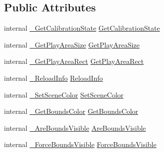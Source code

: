 \subsection*{Public Attributes}
\begin{DoxyCompactItemize}
\item 
internal \mbox{\hyperlink{struct_valve_1_1_v_r_1_1_i_v_r_chaperone_ae940ed5f0954e57503fd3c59e6a52bbd}{\+\_\+\+Get\+Calibration\+State}} \mbox{\hyperlink{struct_valve_1_1_v_r_1_1_i_v_r_chaperone_a0c4eddaed9adf7789b4722c2b66e75d9}{Get\+Calibration\+State}}
\item 
internal \mbox{\hyperlink{struct_valve_1_1_v_r_1_1_i_v_r_chaperone_a2eada0fcf01f701837846219447de33d}{\+\_\+\+Get\+Play\+Area\+Size}} \mbox{\hyperlink{struct_valve_1_1_v_r_1_1_i_v_r_chaperone_a4293e2f9b2d3ce4109520e2255d651e5}{Get\+Play\+Area\+Size}}
\item 
internal \mbox{\hyperlink{struct_valve_1_1_v_r_1_1_i_v_r_chaperone_a489fd7799318412b5ecf95dba2dadc6a}{\+\_\+\+Get\+Play\+Area\+Rect}} \mbox{\hyperlink{struct_valve_1_1_v_r_1_1_i_v_r_chaperone_a4586ae0d839568f24485414975d0f51d}{Get\+Play\+Area\+Rect}}
\item 
internal \mbox{\hyperlink{struct_valve_1_1_v_r_1_1_i_v_r_chaperone_a8de5e80b3169e3fa61c6bed940006796}{\+\_\+\+Reload\+Info}} \mbox{\hyperlink{struct_valve_1_1_v_r_1_1_i_v_r_chaperone_a783f0aaa0cdb9747595300a48ebf49a0}{Reload\+Info}}
\item 
internal \mbox{\hyperlink{struct_valve_1_1_v_r_1_1_i_v_r_chaperone_ac52b4f817e60c163ab42c6fbe71cd116}{\+\_\+\+Set\+Scene\+Color}} \mbox{\hyperlink{struct_valve_1_1_v_r_1_1_i_v_r_chaperone_a4c43b34facc6450ec73f70dae7349fae}{Set\+Scene\+Color}}
\item 
internal \mbox{\hyperlink{struct_valve_1_1_v_r_1_1_i_v_r_chaperone_a57187a62a05e7c3b6e31254db3608027}{\+\_\+\+Get\+Bounds\+Color}} \mbox{\hyperlink{struct_valve_1_1_v_r_1_1_i_v_r_chaperone_a26b6cc95b407e96d954f102c189a89f7}{Get\+Bounds\+Color}}
\item 
internal \mbox{\hyperlink{struct_valve_1_1_v_r_1_1_i_v_r_chaperone_a289d2c423a5d733af2043862b4540305}{\+\_\+\+Are\+Bounds\+Visible}} \mbox{\hyperlink{struct_valve_1_1_v_r_1_1_i_v_r_chaperone_a4761146053f0f72a80fe1c32454b35bc}{Are\+Bounds\+Visible}}
\item 
internal \mbox{\hyperlink{struct_valve_1_1_v_r_1_1_i_v_r_chaperone_a39b5cfdb71537a5db356ab1783035fae}{\+\_\+\+Force\+Bounds\+Visible}} \mbox{\hyperlink{struct_valve_1_1_v_r_1_1_i_v_r_chaperone_ae2b54756ba7feacf2db57665b1d41f91}{Force\+Bounds\+Visible}}
\end{DoxyCompactItemize}



